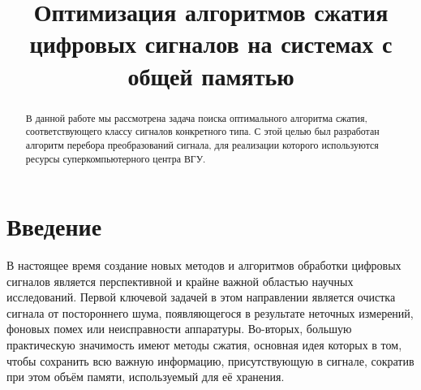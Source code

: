 \documentclass[11pt, oneside, a4paper]{article}
\begin{document}

\title{Оптимизация алгоритмов сжатия цифровых сигналов на системах с общей памятью}


\begin{abstract}
В данной работе мы рассмотрена задача поиска оптимального алгоритма сжатия, соответствующего классу сигналов конкретного типа. С этой целью был разработан алгоритм перебора преобразований сигнала, для реализации которого используются ресурсы суперкомпьютерного центра ВГУ.
\end{abstract}



\section{Введение}

В настоящее время создание новых методов и алгоритмов обработки цифровых сигналов является перспективной и крайне важной областью научных исследований. Первой ключевой задачей в этом направлении является очистка сигнала от постороннего шума, появляющегося в результате неточных измерений, фоновых помех или неисправности аппаратуры. Во-вторых, большую практическую значимость имеют методы сжатия, основная идея которых в том, чтобы сохранить всю важную информацию, присутствующую в сигнале, сократив при этом объём памяти, используемый для её хранения.
\end{document}
